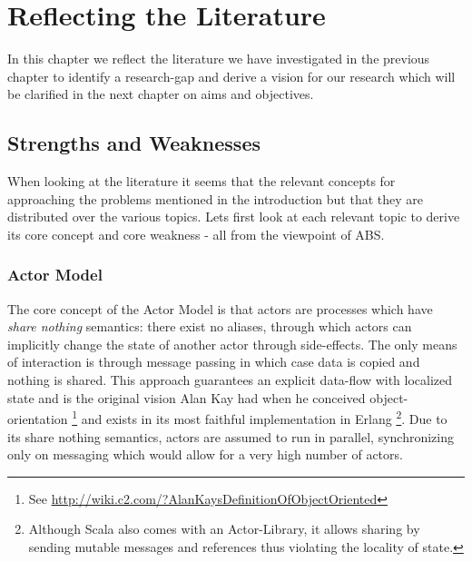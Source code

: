\chapter{Reflecting the Literature}
\label{chap:refl}

In this chapter we reflect the literature we have investigated in the previous chapter to identify a research-gap and derive a vision for our research which will be clarified in the next chapter on aims and objectives.

\section{Strengths and Weaknesses}
When looking at the literature it seems that the relevant concepts for approaching the problems mentioned in the introduction but that they are distributed over the various topics. Lets first look at each relevant topic to derive its core concept and core weakness - all from the viewpoint of ABS.

\subsection{Actor Model}
The core concept of the Actor Model is that actors are processes which have \textit{share nothing} semantics: there exist no aliases, through which actors can implicitly change the state of another actor through side-effects. The only means of interaction is through message passing in which case data is copied and nothing is shared. This approach guarantees an explicit data-flow with localized state and is the original vision Alan Kay had when he conceived object-orientation \footnote{See \url{http://wiki.c2.com/?AlanKaysDefinitionOfObjectOriented}} and exists in its most faithful implementation in Erlang \footnote{Although Scala also comes with an Actor-Library, it allows sharing by sending mutable messages and references thus violating the locality of state.}. Due to its share nothing semantics, actors are assumed to run in parallel, synchronizing only on messaging which would allow for a very high number of actors.


